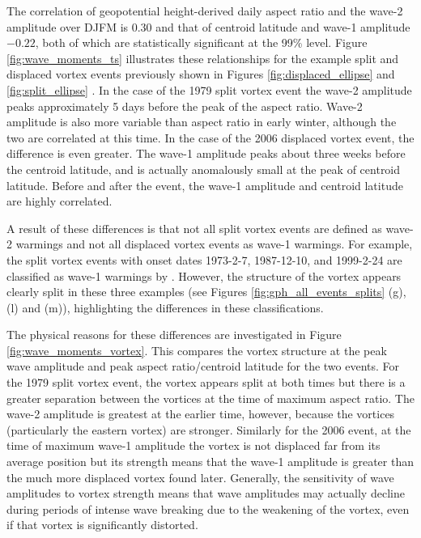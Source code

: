 The correlation of geopotential height-derived daily aspect ratio and the wave-2
amplitude over DJFM is 0.30 and that of centroid latitude and wave-1 amplitude
$-0.22$, both of which are statistically significant at the 99\% level. Figure
\ref{fig:wave_moments_ts} illustrates these relationships for the example split
and displaced vortex events previously shown in Figures
\ref{fig:displaced_ellipse} and \ref{fig:split_ellipse} . In the case of the
1979 split vortex event the wave-2 amplitude peaks approximately 5 days before
the peak of the aspect ratio. Wave-2 amplitude is also more variable than aspect
ratio in early winter, although the two are correlated at this time. In the case
of the 2006 displaced vortex event, the difference is even greater. The wave-1
amplitude peaks about three weeks before the centroid latitude, and is actually
anomalously small at the peak of centroid latitude. Before and after the event,
the wave-1 amplitude and centroid latitude are highly correlated.

A result of these differences is that not all split vortex events are defined as
wave-2 warmings and not all displaced vortex events as wave-1 warmings. For
example, the split vortex events with onset dates 1973-2-7, 1987-12-10, and
1999-2-24 are classified as wave-1 warmings by \citet{Bancala2012}. However, the
structure of the vortex appears clearly split in these three examples (see
Figures \ref{fig:gph_all_events_splits} (g), (l) and (m)), highlighting the
differences in these classifications.

The physical reasons for these differences are investigated in Figure
\ref{fig:wave_moments_vortex}. This compares the vortex structure at the peak
wave amplitude and peak aspect ratio/centroid latitude for the two events. For
the 1979 split vortex event, the vortex appears split at both times but there is
a greater separation between the vortices at the time of maximum aspect
ratio. The wave-2 amplitude is greatest at the earlier time, however, because
the vortices (particularly the eastern vortex) are stronger. Similarly for the
2006 event, at the time of maximum wave-1 amplitude the vortex is not displaced
far from its average position but its strength means that the wave-1 amplitude
is greater than the much more displaced vortex found later. Generally, the
sensitivity of wave amplitudes to vortex strength means that wave amplitudes may
actually decline during periods of intense wave breaking due to the weakening of
the vortex, even if that vortex is significantly distorted.

